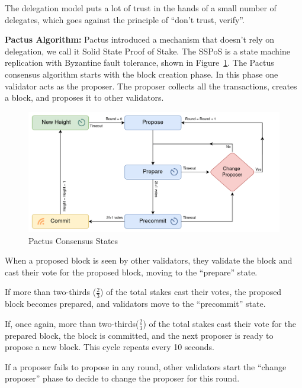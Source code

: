 \documentclass{novel}
\begin{document}
The delegation model puts a lot of trust in the hands of a small number of delegates, which goes against the principle of “don’t trust, verify”.
	
\textbf{Pactus Algorithm:} Pactus introduced a mechanism that doesn’t rely on delegation, we call it Solid State Proof of Stake. The SSPoS is a state machine replication with Byzantine fault tolerance, shown in Figure~\ref{fig:pcs}. The Pactus consensus algorithm starts with the block creation phase. In this phase one validator acts as the proposer. The proposer collects all the transactions, creates a block, and proposes it to other validators.

%
\begin{figure}[h]
	\centering
	\includegraphics[scale=0.23]{pcs.png}
	\caption{Pactus Consensus States }
	\label{fig:pcs}
	\centering
\end{figure}

When a proposed block is seen by other validators, they validate the block and cast their vote for the proposed block, moving to the “prepare” state.

If more than two-thirds ($\frac{2}{3}$) of the total stakes cast their votes, the proposed block becomes prepared, and validators move to the “precommit” state.

If, once again, more than two-thirds($\frac{2}{3}$) of the total stakes cast their vote for the prepared block, the block is committed, and the next proposer is ready to propose a new block. This cycle repeats every 10 seconds.

If a proposer fails to propose in any round, other validators start the “change proposer” phase to decide to change the proposer for this round.
\end{document}
